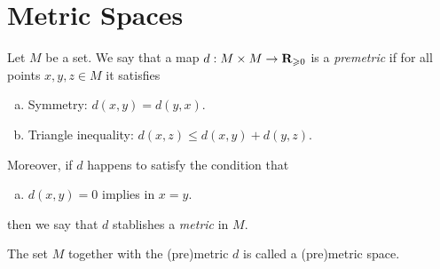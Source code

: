 \section{Metric Spaces}


\begin{definition}
\label{def:premetric-and-metric-space}
Let \(M\) be a set. We say that a map \(d: M \times M \to \mathbf{R}_{\geqslant 0}\) is a
\emph{premetric} if for all points \(x, y, z \in M\) it satisfies
\begin{enumerate}[(a)]\setlength\itemsep{0em}
\item Symmetry: \(d(x, y) = d(y, x)\).
\item Triangle inequality: \(d(x, z) \leq d(x, y) + d(y, z)\).
\end{enumerate}
Moreover, if \(d\) happens to satisfy the condition that
\begin{enumerate}[(a)]\setlength\itemsep{0em}\setcounter{enumi}{2}
\item \(d(x, y) = 0\) implies in \(x = y\).
\end{enumerate}
then we say that \(d\) stablishes a \emph{metric} in \(M\).

The set \(M\) together with the (pre)metric \(d\) is called a (pre)metric space.
\end{definition}

